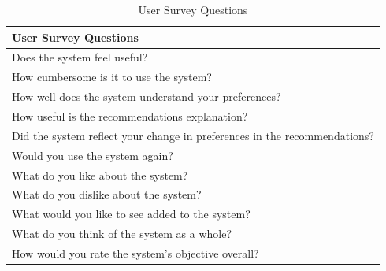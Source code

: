 \begin{table}[h!]
    \centering
    \begin{tabular}{p{}}
    \hline
    \textbf{User Survey Questions} \\ \hline
    Does the system feel useful? \\ 
    How cumbersome is it to use the system? \\ 
    How well does the system understand your preferences? \\ 
    How useful is the recommendations explanation? \\ 
    Did the system reflect your change in preferences in the recommendations? \\ 
    Would you use the system again? \\ 
    What do you like about the system? \\ 
    What do you dislike about the system? \\ 
    What would you like to see added to the system? \\ 
    What do you think of the system as a whole? \\ 
    How would you rate the system's objective overall? \\ \hline
    \end{tabular}
    \caption{User Survey Questions}
    \label{tab:user_survey_questions}
    \end{table}
    